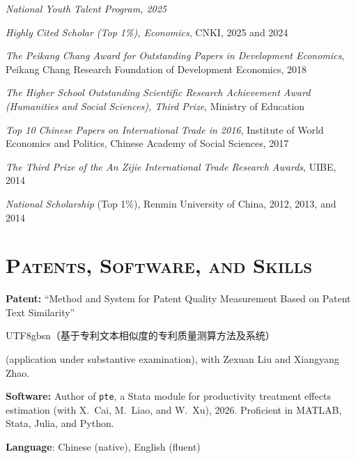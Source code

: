 \documentclass[letterpaper]{article}
\newcommand{\cj}[1]{{\begin{CJK}{UTF8}{gbsn}#1\end{CJK}}}
\begin{document}
\textit{National Youth Talent Program, 2025}

\textit{Highly Cited Scholar (Top 1\%), Economics}, CNKI, 2025 and 2024

\vspace{0.5em}
\textit{The  Peikang Chang Award for Outstanding Papers in Development Economics}, Peikang Chang Research Foundation of Development Economics, 2018

\vspace{0.5em}
\textit{The  Higher School Outstanding Scientific Research Achievement Award (Humanities and Social Sciences), Third Prize}, Ministry of Education

\vspace{0.5em}
\textit{Top 10 Chinese Papers on International Trade in 2016}, Institute of World Economics and Politics, Chinese Academy of Social Sciences, 2017

\vspace{0.5em}
\textit{The Third Prize of the  An Zijie International Trade Research Awards}, UIBE, 2014

\vspace{0.5em}
\textit{National Scholarship} (Top 1\%), Renmin University of China, 2012, 2013, and 2014

\section*{\textsc{Patents, Software, and Skills}}
\textbf{Patent:} ``Method and System for Patent Quality Measurement Based on Patent Text Similarity'' \cj{（基于专利文本相似度的专利质量测算方法及系统）} (application under substantive examination), with Zexuan Liu and Xiangyang Zhao.

\vspace{0.5em}
\textbf{Software:} Author of \texttt{pte}, a Stata module for productivity treatment effects estimation (with X.\ Cai, M.\ Liao, and W.\ Xu), 2026. Proficient in MATLAB, Stata, Julia, and Python.

\vspace{0.5em}
\textbf{Language}: Chinese (native), English (fluent)
\end{document}

